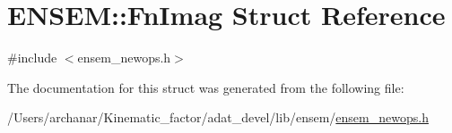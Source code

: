 \hypertarget{structENSEM_1_1FnImag}{}\section{E\+N\+S\+EM\+:\+:Fn\+Imag Struct Reference}
\label{structENSEM_1_1FnImag}


{\ttfamily \#include $<$ensem\+\_\+newops.\+h$>$}



The documentation for this struct was generated from the following file\+:\begin{DoxyCompactItemize}
\item 
/\+Users/archanar/\+Kinematic\+\_\+factor/adat\+\_\+devel/lib/ensem/\mbox{\hyperlink{lib_2ensem_2ensem__newops_8h}{ensem\+\_\+newops.\+h}}\end{DoxyCompactItemize}

